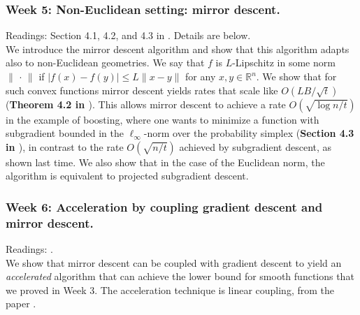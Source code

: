 \subsubsection*{Week 5: Non-Euclidean setting: mirror descent.}
Readings: Section 4.1, 4.2, and 4.3 in \cite{bubeck}. Details are below.\\

We introduce the mirror descent algorithm and show that this algorithm adapts also to non-Euclidean geometries. We say that $f$ is $L$-Lipschitz in some norm $\|\,\cdot\,\|$ if $|f(x) - f(y)| \le L \| x - y \|$ for any $x,y\in\mathbb{R}^n$. We show that for such convex functions mirror descent yields rates that scale like $O(LB/\sqrt{t})$ (\textbf{Theorem 4.2 in \cite{bubeck}}). This allows mirror descent to achieve a rate $O(\sqrt{\log n/t})$ in the example of boosting, where one wants to minimize a function with subgradient bounded in the $\ell_\infty$-norm over the probability simplex (\textbf{Section 4.3 in \cite{bubeck}}), in contrast to the rate $O(\sqrt{n/t})$ achieved by subgradient descent, as shown last time. We also show that in the case of the Euclidean norm, the algorithm is equivalent to projected subgradient descent.

\subsubsection*{Week 6: Acceleration by coupling gradient descent and mirror descent.}
Readings: \cite{linearcoupling}.\\

We show that mirror descent can be coupled with gradient descent to yield an \emph{accelerated} algorithm that can achieve the lower bound for smooth functions that we proved in Week 3. The acceleration technique is linear coupling, from the paper \cite{linearcoupling}.


